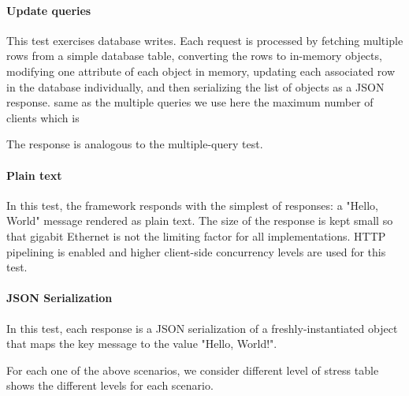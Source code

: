 \paragraph{Update queries}

This test exercises database writes. Each request is processed by fetching multiple rows from a simple database table, converting the rows to in-memory objects, modifying one attribute of each object in memory, updating each associated row in the database individually, and then serializing the list of objects as a JSON response.
same as the multiple queries  we use here  the maximum number of clients which is 

The response is analogous to the multiple-query test.

\paragraph{Plain text}
In this test, the framework responds with the simplest of responses: a "Hello, World" message rendered as plain text. The size of the response is kept small so that gigabit Ethernet is not the limiting factor for all implementations. HTTP pipelining is enabled and higher client-side concurrency levels are used for this test.

\paragraph{JSON Serialization}
In this test, each response is a JSON serialization of a freshly-instantiated object that maps the key message to the value "Hello, World!".



For each one of the above scenarios, we consider different level of stress table shows the different levels for each scenario.

